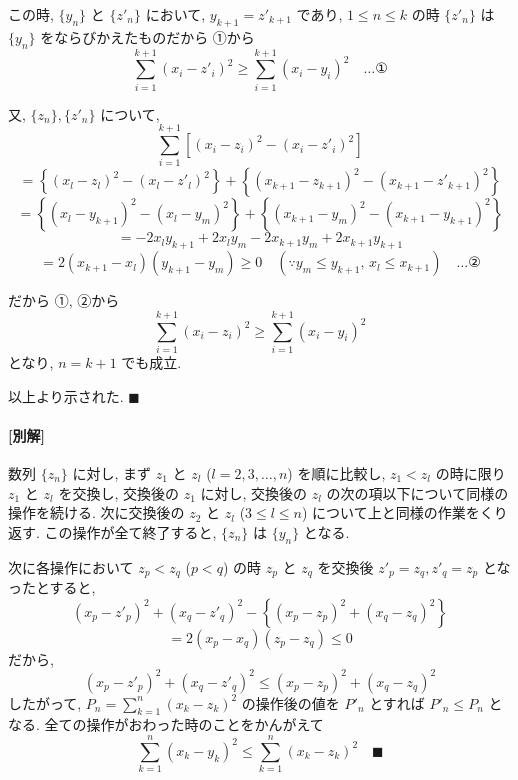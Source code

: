 \documentclass[../main.tex]{subfiles}
\begin{document}
この時, $\{y_n\}$ と $\{z'_n\}$ において, $y_{k+1} = z'_{k+1}$ であり, $1 \le n \le k$ の時 $\{z'_n\}$ は $\{y_n\}$ をならびかえたものだから ①から
\[
  \sum_{i=1}^{k+1} (x_i - z'_i)^2 \ge \sum_{i=1}^{k+1} (x_i - y_i)^2 \quad \dots \text{①}
\]

又, $\{z_n\}, \{z'_n\}$ について,
\[
  \sum_{i=1}^{k+1} \left[ (x_i - z_i)^2 - (x_i - z'_i)^2 \right]
\]
\[
  = \left\{ (x_l - z_l)^2 - (x_l - z'_l)^2 \right\} + \left\{ (x_{k+1} - z_{k+1})^2 - (x_{k+1} - z'_{k+1})^2 \right\}
\]
\[
  = \left\{ (x_l - y_{k+1})^2 - (x_l - y_m)^2 \right\} + \left\{ (x_{k+1} - y_m)^2 - (x_{k+1} - y_{k+1})^2 \right\}
\]
\[
  = -2x_l y_{k+1} + 2x_l y_m - 2x_{k+1} y_m + 2x_{k+1} y_{k+1}
\]
\[
  = 2(x_{k+1} - x_l)(y_{k+1} - y_m) \ge 0 \quad (\because y_m \le y_{k+1}, \, x_l \le x_{k+1}) \quad \dots \text{②}
\]

だから ①, ②から
\[
  \sum_{i=1}^{k+1} (x_i - z_i)^2 \ge \sum_{i=1}^{k+1} (x_i - y_i)^2
\]
となり, $n = k+1$ でも成立.

以上より示された. \hfill $\blacksquare$

\paragraph{[別解]}

数列 $\{z_n\}$ に対し, まず $z_1$ と $z_l$ ($l = 2, 3, \dots, n$) を順に比較し, $z_1 < z_l$ の時に限り $z_1$ と $z_l$ を交換し, 交換後の $z_1$ に対し, 交換後の $z_l$ の次の項以下について同様の操作を続ける. 次に交換後の $z_2$ と $z_l$ ($3 \le l \le n$) について上と同様の作業をくり返す. この操作が全て終了すると, $\{z_n\}$ は $\{y_n\}$ となる.

次に各操作において $z_p < z_q$ ($p < q$) の時 $z_p$ と $z_q$ を交換後 $z'_p = z_q, z'_q = z_p$ となったとすると,
\[
  (x_p - z'_p)^2 + (x_q - z'_q)^2 - \left\{ (x_p - z_p)^2 + (x_q - z_q)^2 \right\}
\]
\[
  = 2(x_p - x_q)(z_p - z_q) \le 0
\]
だから,
\[
  (x_p - z'_p)^2 + (x_q - z'_q)^2 \le (x_p - z_p)^2 + (x_q - z_q)^2
\]
したがって, $P_n = \sum_{k=1}^n (x_k - z_k)^2$ の操作後の値を $P'_n$ とすれば $P'_n \le P_n$ となる. 全ての操作がおわった時のことをかんがえて
\[
  \sum_{k=1}^n (x_k - y_k)^2 \le \sum_{k=1}^n (x_k - z_k)^2 \quad \blacksquare
\]
\end{document}
